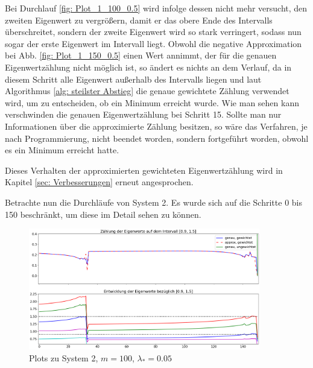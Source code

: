 \documentclass[a4paper,12pt]{report}
\newcommand{\1}{\mathds{1}}
\theoremstyle{plain} %
\theoremstyle{definition} %
\theoremstyle{remark}
\begin{document}
            Bei Durchlauf \ref{fig: Plot_1_100_0.5} wird infolge dessen nicht mehr versucht, den zweiten Eigenwert zu vergrößern,
            damit er das obere Ende des Intervalls überschreitet, sondern der zweite Eigenwert wird so stark verringert, sodass nun sogar der erste Eigenwert im Intervall liegt.
            Obwohl die negative Approximation bei Abb. \ref{fig: Plot_1_150_0.5} einen Wert annimmt, der für die genauen Eigenwertzählung nicht möglich ist, so ändert es nichts an dem Verlauf,
            da in diesem Schritt alle Eigenwert außerhalb des Intervalls liegen und laut Algorithmus \ref{alg: steilster Abstieg}
            die genaue gewichtete Zählung verwendet wird, um zu entscheiden, ob ein Minimum erreicht wurde. Wie man sehen kann verschwinden die genauen Eigenwertzählung bei Schritt 15.
            Sollte man nur Informationen über die approximierte Zählung besitzen, so wäre das Verfahren, je nach Programmierung,
            nicht beendet worden, sondern fortgeführt worden, obwohl es ein Minimum erreicht hatte.

            Dieses Verhalten der approximierten gewichteten Eigenwertzählung wird in Kapitel \ref{sec: Verbesserungen} erneut angesprochen.

            Betrachte nun die Durchläufe von System 2.
            Es wurde sich auf die Schritte 0 bis 150 beschränkt, um diese im Detail sehen zu können.

            \begin{figure}[h!t]
                  \centering
                  \includegraphics[width=0.9\textwidth, keepaspectratio]{./Original/Plot_2_100_0.05.png}
                  \caption{Plots zu System 2, $m=100$, $\lambda_*=0.05$}
                  \label{fig: Plot_2_100_0.05}
            \end{figure}
\end{document}
